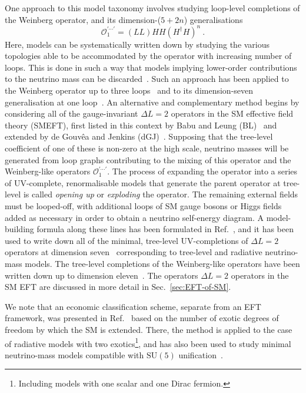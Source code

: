 One approach to this model taxonomy involves studying loop-level completions of
the Weinberg operator, and its dimension-($5+2n$) generalisations
\begin{equation*}
 \mathcal{O}_1^{\prime \cdots \prime} = (LL)HH(H^\dagger H)^n  \ .
\end{equation*}
Here, models can be systematically written down by studying the various
topologies able to be accommodated by the operator with increasing number of
loops. This is done in such a way that models implying lower-order contributions
to the neutrino mass can be discarded~\cite{Farzan:2012ev}. Such an approach has
been applied to the Weinberg operator up to three loops~\cite{Bonnet:2012kz,
  Sierra:2014rxa, Cepedello:2018rfh} and to its dimension-seven generalisation
at one loop~\cite{Cepedello:2017eqf}. An alternative and complementary method
begins by considering all of the gauge-invariant $\Delta L = 2$ operators in the
SM effective field theory (SMEFT), first listed in this context by Babu and
Leung (BL)~\cite{Babu:2001ex} and extended by de Gouv\^{e}a and Jenkins
(dGJ)~\cite{deGouvea:2007qla}. Supposing that the tree-level coefficient of one
of these is non-zero at the high scale, neutrino masses will be generated from
loop graphs contributing to the mixing of this operator and the Weinberg-like
operators $\mathcal{O}_1^{\prime \cdots \prime}$. The process of expanding the
operator into a series of UV-complete, renormalisable models that generate the
parent operator at tree-level is called \emph{opening up} or \emph{exploding}
the operator. The remaining external fields must be looped-off, with additional
loops of SM gauge bosons or Higgs fields added as necessary in order to obtain a
neutrino self-energy diagram. A model-building formula along these lines has
been formulated in Ref.~\cite{PhysRevD.87.073007}, and it has been used to write
down all of the minimal, tree-level UV-completions of $\Delta L = 2$ operators
at dimension seven~\cite{Cai:2014kra} corresponding to tree-level and radiative
neutrino-mass models. The tree-level completions of the Weinberg-like operators
have been written down up to dimension eleven~\cite{Cai:2014kra, Bonnet:2009ej,
  Anamiati:2018cuq}. The operators $\Delta L = 2$ operators in the SM EFT are
discussed in more detail in Sec.~\ref{sec:EFT-of-SM}.

We note that an economic classification scheme, separate from an EFT framework,
was presented in Ref.~\cite{Klein:2019iws} based on the number of exotic degrees
of freedom by which the SM is extended. There, the method is applied to the case
of radiative models with two exotics\footnote{Including models with one scalar
  and one Dirac fermion.}, and has also been used to study minimal neutrino-mass
models compatible with $\mathrm{SU}(5)$ unification~\cite{Klein:2019jgb}.

